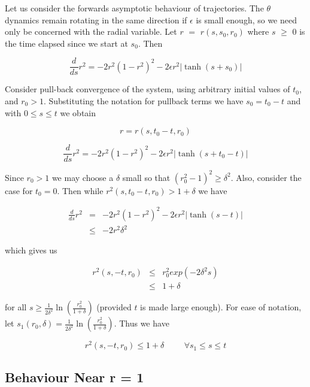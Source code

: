 Let us consider the forwards asymptotic behaviour of trajectories. The
$\theta$ dynamics remain rotating in the same direction if $\epsilon$ is
small enough, so we need only be concerned with the radial variable.
Let $r$ $=$ $r(s,s_0,r_0)$ where  $s$ $\geq$ $0$ is the time elapsed since
we start at $s_0$. Then

\[ \frac{d}{ds} r^2 = - 2r^2(1-r^2)^2 - 2 \epsilon r^2 |\tanh (s+s_{0})| \]

Consider pull-back convergence of the system, using arbitrary initial values
of $t_{0}$, and $r_{0} > 1$. Substituting the notation for pullback terms we have $s_{0} = t_{0} - t$ and with $0 \leq s \leq t$ we obtain

\[  r = r(s,t_{0}-t,r_{0}) \]

\begin{equation}
  \frac{d}{ds} r^2 = - 2r^2(1-r^2)^2 - 2 \epsilon r^2 |\tanh (s+t_{0}-t)|
\label{deriv}
\end{equation}

Since $r_{0} > 1$ we may choose a $\delta$ small so that $(r_{0}^{2}-1)^{2} \geq \delta^{2}$.  Also, consider the case for $t_{0} = 0$. Then while $r^2(s,t_{0}-t,r_{0}) > 1 + \delta$ we have

\begin{eqnarray*}
  \frac{d}{ds} r^2  & = & - 2r^2(1-r^2)^2 - 2 \epsilon r^2 |\tanh (s-t)| \\
  & \leq & - 2 r^2 \delta^{2}
\end{eqnarray*}

which gives us

\begin{eqnarray*}
r^2(s,-t,r_0)  & \leq & r_0^2 exp(- 2 \delta^{2}s) \\[2ex]
& \leq & 1 + \delta
\end{eqnarray*}

for all $s \geq \frac{1}{2 \delta^{2}} \ln \left( \frac{r_{0}^2}{1+\delta}
\right)$ (provided $t$ is made large enough). For ease of notation, let $s_{1}(r_{0},\delta) = \frac{1}{2 \delta^{2}} \ln \left( \frac{r_{0}^2}{1+\delta}
\right)$. Thus we have

\begin{equation}
  r^2(s,-t,r_{0}) \leq 1 + \delta \hspace{1cm} \forall s_{1} \leq s \leq t
\end{equation}

\subsection{Behaviour Near r = 1}

